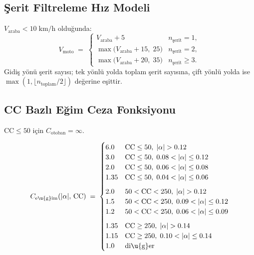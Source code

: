 \documentclass[11pt,a4paper]{article}
\newcommand{\CC}{\mathrm{CC}}
\theoremstyle{definition}
\begin{document}
\subsection{\c{S}erit Filtreleme H{\i}z Modeli}

$V_{\mathrm{araba}} < 10\;\mathrm{km/h}$ oldu\u{g}unda:
\begin{equation}\label{eq:filter}
  V_{\mathrm{moto}}
  \;=\;
  \begin{cases}
    V_{\mathrm{araba}} + 5
      & n_{\text{şerit}} = 1,\\[4pt]
    \max\!\big(V_{\mathrm{araba}} + 15,\; 25\big)
      & n_{\text{şerit}} = 2,\\[4pt]
    \max\!\big(V_{\mathrm{araba}} + 20,\; 35\big)
      & n_{\text{şerit}} \ge 3.
  \end{cases}
\end{equation}
Gidi\c{s} y\"on\"u \c{s}erit say{\i}s{\i}; tek y\"onl\"u yolda
toplam \c{s}erit say{\i}s{\i}na, \c{c}ift y\"onl\"u yolda ise
$\max(1,\lfloor n_{\text{toplam}}/2\rfloor)$ de\u{g}erine e\c{s}ittir.

\subsection{CC Bazl{\i} E\u{g}im Ceza Fonksiyonu}

$\CC\le 50$ i\c{c}in $C_{\mathrm{otoban}}=\infty$.

\begin{equation}\label{eq:cc_grade}
  C_{\mathrm{e\u{g}im}}(|\alpha|,\,\CC)
  \;=\;
  \begin{cases}
    6.0 & \CC\le 50,\;|\alpha|>0.12\\
    3.0 & \CC\le 50,\;0.08<|\alpha|\le 0.12\\
    2.0 & \CC\le 50,\;0.06<|\alpha|\le 0.08\\
    1.35& \CC\le 50,\;0.04<|\alpha|\le 0.06\\[6pt]
    2.0 & 50<\CC<250,\;|\alpha|>0.12\\
    1.5 & 50<\CC<250,\;0.09<|\alpha|\le 0.12\\
    1.2 & 50<\CC<250,\;0.06<|\alpha|\le 0.09\\[6pt]
    1.35& \CC\ge 250,\;|\alpha|>0.14\\
    1.15& \CC\ge 250,\;0.10<|\alpha|\le 0.14\\
    1.0 & \text{di\u{g}er}
  \end{cases}
\end{equation}
\end{document}
